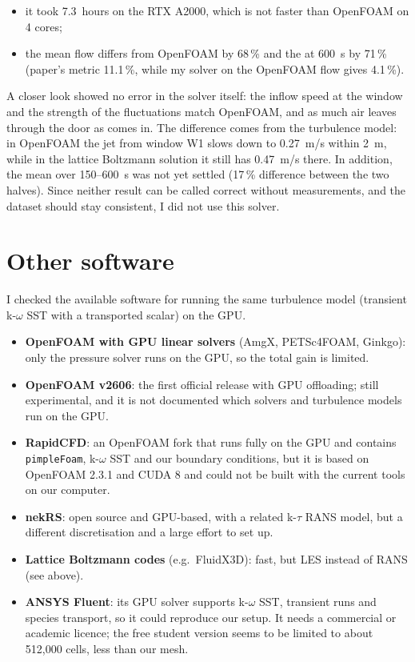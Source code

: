 \begin{itemize}
  \item it took 7.3~hours on the RTX A2000, which is not faster than OpenFOAM on 4 cores;
  \item the mean flow differs from OpenFOAM by 68\,\% and the \cotwo{} at 600~s by 71\,\% (paper's metric
        11.1\,\%, while my \cotwo{} solver on the OpenFOAM flow gives 4.1\,\%).
\end{itemize}

A closer look showed no error in the solver itself: the inflow speed at the window and the strength of the
fluctuations match OpenFOAM, and as much air leaves through the door as comes in. The difference comes from the turbulence model: in OpenFOAM the jet
from window W1 slows down to 0.27~m/s within 2~m, while in the lattice Boltzmann solution it still has 0.47~m/s
there. In addition, the mean over 150--600~s was not yet settled (17\,\% difference between the two halves). Since
neither result can be called correct without measurements, and the dataset should stay consistent, I did not use
this solver.

\section{Other software}
I checked the available software for running the same turbulence model (transient k-$\omega$ SST with a
transported scalar) on the GPU. 
\begin{itemize}
  \item \textbf{OpenFOAM with GPU linear solvers} (AmgX, PETSc4FOAM, Ginkgo): only the pressure solver runs on the
        GPU, so the total gain is limited.
  \item \textbf{OpenFOAM v2606}: the first official release with GPU offloading; still experimental, and it is
        not documented which solvers and turbulence models run on the GPU.
  \item \textbf{RapidCFD}: an OpenFOAM fork that runs fully on the GPU and contains \texttt{pimpleFoam},
        k-$\omega$ SST and our boundary conditions, but it is based on OpenFOAM 2.3.1 and CUDA 8 and could not be
        built with the current tools on our computer.
  \item \textbf{nekRS}: open source and GPU-based, with a related k-$\tau$ RANS model, but a different
        discretisation and a large effort to set up.
  \item \textbf{Lattice Boltzmann codes} (e.g.\ FluidX3D): fast, but LES instead of RANS (see above).
  \item \textbf{ANSYS Fluent}: its GPU solver supports k-$\omega$ SST, transient runs and species transport, so it
        could reproduce our setup. It needs a commercial or academic licence; the free student version seems to be
        limited to about 512,000 cells, less than our mesh. 
\end{itemize}
